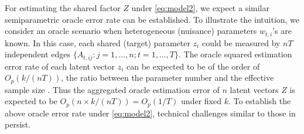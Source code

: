 \documentclass[12pt]{article}
\begin{document}
For estimating the shared factor $Z$ under \eqref{eq:model2}, we expect a similar semiparametric oracle error rate can be established. 
To illustrate the intuition, we consider an oracle scenario  when heterogeneous (nuisance) parameters $w_{t,i}$'s are known. 
In this case, each shared (target) parameter $z_i$ could be measured by $nT$ independent edges $\{A_{t,ij}: j=1,\ldots, n; t=1,\ldots, T\}$.    
The oracle squared estimation error rate of each latent vector $z_i$ can be expected to be of the order of $O_p(k/(nT))$, the ratio between the parameter number and the effective sample size  \citep{portnoy1988asymptotic}. Thus the aggregated oracle estimation error of $n$ latent vectors $Z$ is expected to be $O_p(n\times  k/(nT))=O_p(1/T)$ under fixed $k$.  
To establish the above oracle error rate   under \eqref{eq:model2}, technical challenges similar to those in \cite{he2023semiparametric}  persist. 
\end{document}
